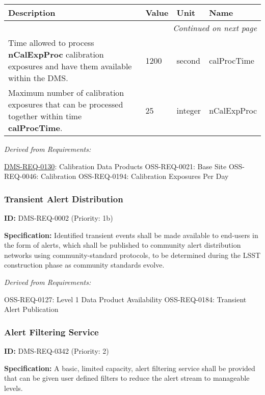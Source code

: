 \documentclass[SE,toc,lsstdraft]{lsstdoc}
\makeatletter
\newcommand{\paramname}[1]{\hspace{0pt}#1}
\newcommand{\unitname}[1]{\hspace{0pt}#1}
\newenvironment{parameters}[0]{%
\setlength\LTleft{0pt}
\setlength\LTright{\fill}
\begin{small}
\begin{longtable}[]{|p{0.49\textwidth}|l|p{0.6in}|p{1.70in}@{}|}

\hline \textbf{Description} & \textbf{Value} & \textbf{Unit} & \textbf{Name} \\ \hline
\endhead

\hline \multicolumn{4}{r}{\emph{Continued on next page}} \\
\endfoot

\hline\hline
\endlastfoot
}{%
\hline
\end{longtable}
\end{small}
}
\makeatother
\begin{document}
\begin{parameters}
Time allowed to process \textbf{nCalExpProc} calibration exposures and have them available within the DMS.
&
1200
&
\unitname{%
second
}
&
\paramname{%
calProcTime
} \\\hline

Maximum number of calibration exposures that can be processed together within time \textbf{calProcTime}.

&
25
&
\unitname{%
integer
}
&
\paramname{%
nCalExpProc
} \\\hline
\end{parameters}

\emph{Derived from Requirements:}

\hyperref[DMS-REQ-0130]{DMS-REQ-0130}:
Calibration Data Products \newline
OSS-REQ-0021:
Base Site \newline
OSS-REQ-0046:
Calibration \newline
OSS-REQ-0194:
Calibration Exposures Per Day \newline

\subsubsection{Transient Alert Distribution}

\label{DMS-REQ-0002}
\textbf{ID:} DMS-REQ-0002 (Priority: 1b)

\textbf{Specification:} Identified transient events shall be made available to end-users in the form of alerts, which shall be published to community alert distribution networks using community-standard protocols, to be determined during the LSST construction phase as community standards evolve.

\emph{Derived from Requirements:}

OSS-REQ-0127:
Level 1 Data Product Availability \newline
OSS-REQ-0184:
Transient Alert Publication \newline

\subsubsection{Alert Filtering Service}

\label{DMS-REQ-0342}
\textbf{ID:} DMS-REQ-0342 (Priority: 2)

\textbf{Specification:} A basic, limited capacity, alert filtering service shall be provided that can be given user defined filters to reduce the alert stream to manageable levels.
\end{document}
